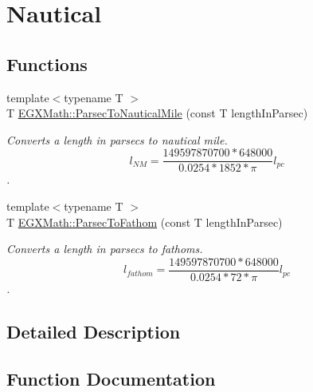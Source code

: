 \hypertarget{group___e_g_x_math-_conversions-_length_conversions-_astronomical-_parsec-_nautical}{}\section{Nautical}
\label{group___e_g_x_math-_conversions-_length_conversions-_astronomical-_parsec-_nautical}
\subsection*{Functions}
\begin{DoxyCompactItemize}
\item 
{\footnotesize template$<$typename T $>$ }\\T \mbox{\hyperlink{group___e_g_x_math-_conversions-_length_conversions-_astronomical-_parsec-_nautical_ga34adb714e6f4da104b25e2b5a2ab114e}{E\+G\+X\+Math\+::\+Parsec\+To\+Nautical\+Mile}} (const T length\+In\+Parsec)
\begin{DoxyCompactList}\small\item\em Converts a length in parsecs to nautical mile. \[ l_{NM}= \frac{149597870700 * 648000}{0.0254 * 1852 * \pi} l_{pc} \]. \end{DoxyCompactList}\item 
{\footnotesize template$<$typename T $>$ }\\T \mbox{\hyperlink{group___e_g_x_math-_conversions-_length_conversions-_astronomical-_parsec-_nautical_gab621169a5b3794b8405b4b0bca2b6092}{E\+G\+X\+Math\+::\+Parsec\+To\+Fathom}} (const T length\+In\+Parsec)
\begin{DoxyCompactList}\small\item\em Converts a length in parsecs to fathoms. \[ l_{fathom}= \frac{149597870700 * 648000}{0.0254 * 72 * \pi} l_{pc} \]. \end{DoxyCompactList}\end{DoxyCompactItemize}


\subsection{Detailed Description}


\subsection{Function Documentation}
\mbox{\label{group___e_g_x_math-_conversions-_length_conversions-_astronomical-_parsec-_nautical_gab621169a5b3794b8405b4b0bca2b6092}} 
